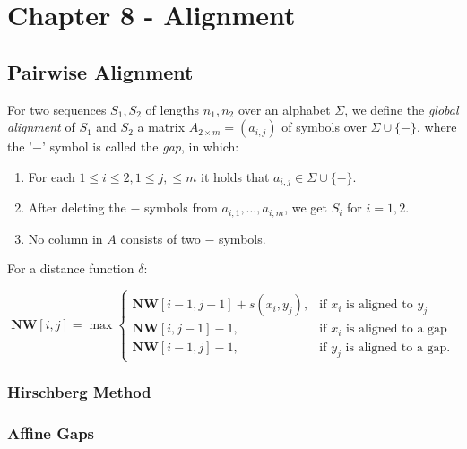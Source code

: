\hypertarget{chapter-8---alignment}{%
\section{Chapter 8 - Alignment}\label{chapter-8---alignment}}

\hypertarget{pairwise-alignment}{%
\subsection{Pairwise Alignment}\label{pairwise-alignment}}

For two sequences $S_1, S_2$ of lengths $n_1, n_2$ over an alphabet $\Sigma$, we define the \textit{global alignment} of $S_1$ and $S_2$ a matrix $A_{2 \times m} = (a_{i,j})$ of symbols over $\Sigma \cup \{-\}$, where the '$-$' symbol is called the \textit{gap}, in which:
\begin{enumerate}
    \item For each $1 \leq i \leq 2, 1 \leq j, \leq m$ it holds that $a_{i,j} \in \Sigma \cup \{-\}$.
    \item After deleting the $-$ symbols from $a_{i,1}, \ldots, a_{i, m}$, we get $S_i$ for $i = 1,2$.
    \item No column in $A$ consists of two $-$ symbols.
\end{enumerate}

For a distance function $\delta: $

\begin{equation}
\textbf{NW}[i, j] = \max
\begin{cases} 
    \textbf{NW}[i - 1, j - 1] + s(x_i, y_j), & \text{if } x_i \text{ is aligned to } y_j\\
    \textbf{NW}[i, j - 1] - 1, & \text{if } x_i \text{ is aligned to a gap}\\
    \textbf{NW}[i - 1, j] - 1, & \text{if } y_j \text{ is aligned to a gap}.
\end{cases}
\end{equation}

\hypertarget{hirschberg-method}{%
\subsubsection{Hirschberg Method}\label{hirschberg-method}}

\subsubsection{Affine Gaps}


